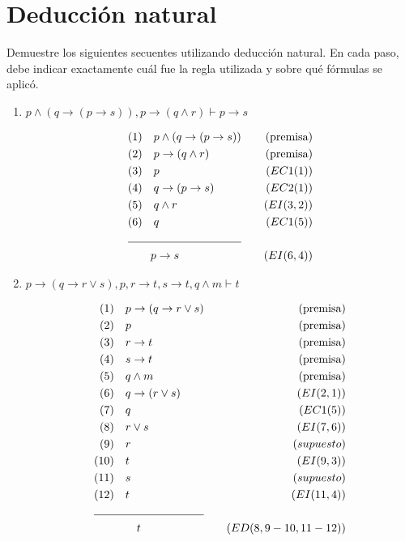 \documentclass{article}
\begin{document}
\newpage

\section{Deducción natural}
Demuestre los siguientes secuentes utilizando deducción natural. En cada paso,
debe indicar exactamente cuál fue la regla utilizada y sobre qué fórmulas se
aplicó.

\begin{enumerate}

  \item
        $p \land (q\rightarrow (p \rightarrow s)), p \rightarrow (q \land r) \vdash p \rightarrow s$

  \begin{align*}
    &(1) \quad p \land (q\rightarrow (p \rightarrow s))  & \quad (\text{premisa}) \\
    &(2) \quad  p \rightarrow (q \land r) & \quad (\text{premisa}) \\
    &(3) \quad  p & \quad (EC1(1)) \\
    &(4) \quad  q \rightarrow (p \rightarrow s) & \quad (EC2(1)) \\
    &(5) \quad  q \land r & \quad (EI(3, 2)) \\
    &(6) \quad  q & \quad (EC1(5)) \\
    \cline{1-2}
    & \qquad p \rightarrow s & \quad (EI(6,4))
  \end{align*}


  \item $p \rightarrow (q \rightarrow r \vee s), p, r \rightarrow t, s \rightarrow t, q\land m \vdash t$

  \begin{align*}
    (1)&\quad p \rightarrow (q \rightarrow r \vee s) & \quad (\text{premisa}) \\
    (2)&\quad p & \quad (\text{premisa}) \\
    (3)&\quad r \rightarrow t & \quad (\text{premisa}) \\
    (4)&\quad s \rightarrow t & \quad (\text{premisa}) \\
    (5)&\quad q \land m & \quad (\text{premisa}) \\
    (6)&\quad q \rightarrow (r \vee s) & \quad (EI(2, 1)) \\
    (7)&\quad q & \quad (EC1(5)) \\
    (8)&\quad r \vee s & \quad (EI(7, 6)) \\
    (9)&\quad r & \quad (supuesto) \\
    (10)& \quad t & \quad (EI(9, 3)) \\
    (11)& \quad s & \quad (supuesto) \\
    (12)& \quad t & \quad (EI(11, 4)) \\
    \cline{1-2}
       & \qquad t & \quad (ED(8, 9-10, 11-12))
  \end{align*}


\end{enumerate}
\end{document}
